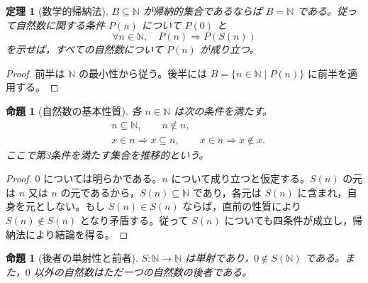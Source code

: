 \documentclass[a5paper,10pt,dvipdfmx]{jsarticle}
\theoremstyle{definition}
\theoremstyle{plain}
\newtheorem{prop}[ruledef]{命題}
\newtheorem{thm}[ruledef]{定理}
\newcommand{\impc}{\Longrightarrow}
\begin{document}
\begin{thm}[数学的帰納法]\label{k100}
$B\subseteq\mathbb N$ が帰納的集合であるならば $B=\mathbb N$ である。従って自然数に関する条件 $P(n)$ について $P(0)$ と
\[ \forall n\in\mathbb N,\quad P(n)\impc P(S(n)) \]
を示せば，すべての自然数について $P(n)$ が成り立つ。
\end{thm}
\begin{proof}
前半は $\mathbb N$ の最小性から従う。後半には $B=\{n\in\mathbb N\mid P(n)\}$ に前半を適用する。
\end{proof}
\begin{prop}[自然数の基本性質]\label{k101}
各 $n\in\mathbb N$ は次の条件を満たす。
\begin{align*}
 &n\subseteq\mathbb N,\qquad n\notin n,\\
 &x\in n\impc x\subseteq n,\qquad x\in n\impc x\notin x.
\end{align*}
ここで第3条件を満たす集合を推移的という。
\end{prop}
\begin{proof}
$0$ については明らかである。$n$ について成り立つと仮定する。$S(n)$ の元は $n$ 又は $n$ の元であるから，$S(n)\subseteq\mathbb N$ であり，各元は $S(n)$ に含まれ，自身を元としない。もし $S(n)\in S(n)$ ならば，直前の性質により $S(n)\notin S(n)$ となり矛盾する。従って $S(n)$ についても四条件が成立し，帰納法により結論を得る。
\end{proof}
\begin{prop}[後者の単射性と前者]\label{k102}
$S\colon\mathbb N\to\mathbb N$ は単射であり，$0\notin S(\mathbb N)$ である。また，$0$ 以外の自然数はただ一つの自然数の後者である。
\end{prop}
\end{document}
